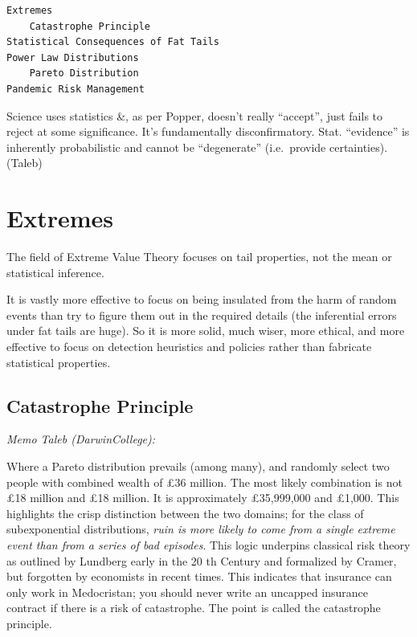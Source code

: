 \documentclass[
]{book}
\begin{document}
\begin{verbatim}
Extremes      
    Catastrophe Principle  
Statistical Consequences of Fat Tails  
Power Law Distributions  
    Pareto Distribution  
Pandemic Risk Management
\end{verbatim}

Science uses statistics \&, as per Popper, doesn't really ``accept'',
just fails to reject at some significance.
It's fundamentally disconfirmatory.
Stat. ``evidence'' is inherently probabilistic and
cannot be ``degenerate'' (i.e.~provide certainties).
(Taleb)

\hypertarget{extremes}{%
\section{Extremes}\label{extremes}}

The field of Extreme Value Theory focuses on tail properties,
not the mean or statistical inference.

It is vastly more effective
to focus on being insulated from the harm of random events
than try to figure them out in the required details
(the inferential errors under fat tails are huge).
So it is more solid, much wiser, more ethical, and more effective to focus on
detection heuristics and policies rather than fabricate statistical properties.

\hypertarget{catastrophe-principle}{%
\subsection{Catastrophe Principle}\label{catastrophe-principle}}

\emph{Memo Taleb (DarwinCollege):}

Where a Pareto distribution
prevails (among many), and randomly select two people with
combined wealth of £36 million. The most likely combination
is not £18 million and £18 million. It is approximately
£35,999,000 and £1,000. This highlights the crisp distinction
between the two domains; for the class of subexponential
distributions, \emph{ruin is more likely to come from a single extreme
event than from a series of bad episodes}. This logic underpins
classical risk theory as outlined by Lundberg early in the 20 th
Century and formalized by Cramer, but forgotten by
economists in recent times. This indicates that insurance can
only work in Medocristan; you should never write an uncapped
insurance contract if there is a risk of catastrophe. The point
is called the catastrophe principle.
\end{document}
